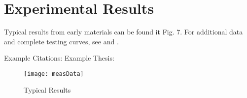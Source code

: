 \section{Experimental Results}
Typical results from early materials can be found it Fig. 7. For additional data and complete testing curves, see \cite{sThesis} and \cite{mThesis}.

Example Citations:
Example Thesis: \cite{IEEEexample:masters}


\begin{figure}[here]
\centering
\texttt{[image: measData]}
\caption{Typical Results}
\label{fig:measData}
\end{figure}

